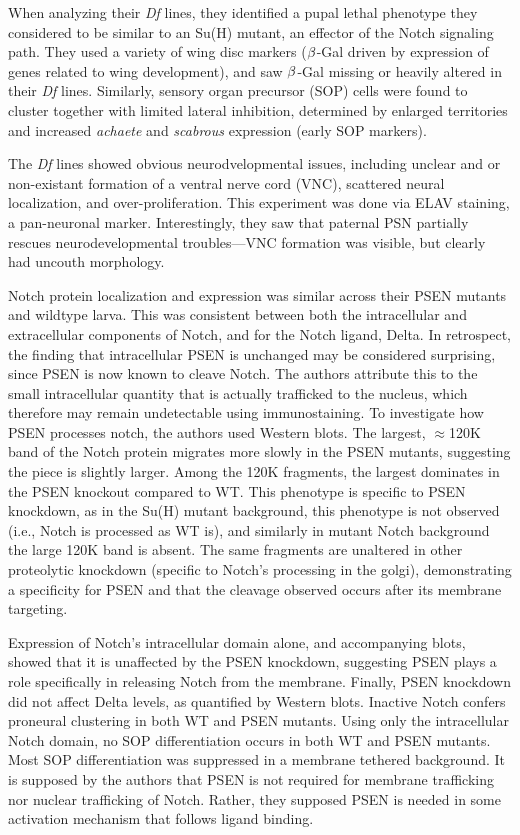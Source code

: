 When analyzing their \textit{Df} lines, they identified a pupal lethal phenotype they considered to be similar to an Su(H) mutant, an effector of the Notch signaling path. They used a variety of wing disc markers ($\beta$-Gal driven by expression of genes related to wing development), and saw $\beta$-Gal missing or heavily altered in their \textit{Df} lines. Similarly, sensory organ precursor (SOP) cells were found to cluster together with limited lateral inhibition, determined by enlarged territories and increased \textit{achaete} and \textit{scabrous} expression (early SOP markers).\newline

The \textit{Df} lines showed obvious neurodvelopmental issues, including unclear and or non-existant formation of a ventral nerve cord (VNC), scattered neural localization, and over-proliferation. This experiment was done via ELAV staining, a pan-neuronal marker. Interestingly, they saw that paternal PSN partially rescues neurodevelopmental troubles---VNC formation was visible, but clearly had uncouth morphology.\newline

Notch protein localization and expression was similar across their PSEN mutants and wildtype larva. This was consistent between both the intracellular and extracellular components of Notch, and for the Notch ligand, Delta. In retrospect, the finding that intracellular PSEN is unchanged may be considered surprising, since PSEN is now known to cleave Notch. The authors attribute this to the small intracellular quantity that is actually trafficked to the nucleus, which therefore may remain undetectable using immunostaining. To investigate how PSEN processes notch, the authors used Western blots. The largest, $\approx$120K band of the Notch protein migrates more slowly in the PSEN mutants, suggesting the piece is slightly larger. Among the 120K fragments, the largest dominates in the PSEN knockout compared to WT. This phenotype is specific to PSEN knockdown, as in the Su(H) mutant background, this phenotype is not observed (i.e., Notch is processed as WT is), and similarly in mutant Notch background the large 120K band is absent. The same fragments are unaltered in other proteolytic knockdown (specific to Notch's processing in the golgi), demonstrating a specificity for PSEN and that the cleavage observed occurs after its membrane targeting.\newline

Expression of Notch's intracellular domain alone, and accompanying blots, showed that it is unaffected by the PSEN knockdown, suggesting PSEN plays a role specifically in releasing Notch from the membrane. Finally, PSEN knockdown did not affect Delta levels, as quantified by Western blots. Inactive Notch confers proneural clustering in both WT and PSEN mutants. Using only the intracellular Notch domain, no SOP differentiation occurs in both WT and PSEN mutants. Most SOP differentiation was suppressed in a membrane tethered background. It is supposed by the authors that PSEN is not required for membrane trafficking nor nuclear trafficking of Notch. Rather, they supposed PSEN is needed in some activation mechanism that follows ligand binding.\newline


